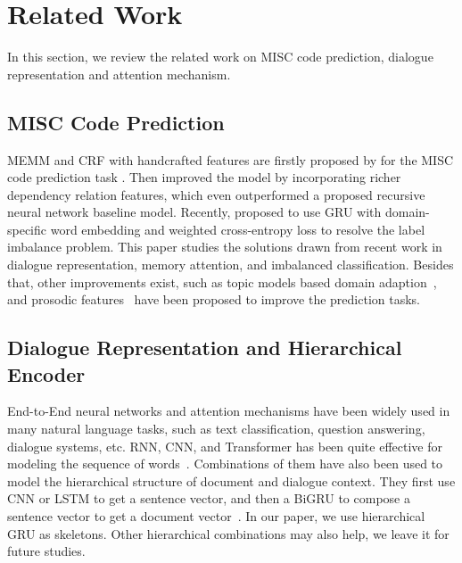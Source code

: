 \section{Related Work}
\label{sec:sentential:related}
In this section, we review the related work on MISC code prediction,
dialogue representation and attention mechanism.

\subsection{MISC Code Prediction}
\label{ssec:sentential:misc-related}

MEMM and CRF with handcrafted features are firstly proposed by
\citet{can2012case, can2015dialog} for the MISC code prediction task
. Then \citet{tanana2015recursive} improved the model by incorporating
richer dependency relation features, which even outperformed a
proposed recursive neural network baseline model. Recently,
\citet{xiao2016behavioral} proposed to use GRU with domain-specific word
embedding and weighted cross-entropy loss to resolve the label
imbalance problem. This paper studies the solutions drawn from
recent work in dialogue representation, memory attention, and
imbalanced classification. Besides that, other improvements exist,
such as topic models based domain adaption~\citep{atkins2014scaling,
  huang2018modeling}, and prosodic features~\citep{weber2002using} have
been proposed to improve the prediction tasks.

\subsection{Dialogue Representation and Hierarchical Encoder }
\label{ssec:sentential:dialogue-encoder}

End-to-End neural networks and attention mechanisms have been widely
used in many natural language tasks, such as text classification,
question answering, dialogue systems, etc.  RNN, CNN, and
Transformer has been quite effective for modeling the sequence of
words~\citep{ kim14cnn,zhang2015character}. Combinations of them have
also been used to model the hierarchical structure of document and
dialogue context. They first use CNN or LSTM to get a sentence vector,
and then a BiGRU to compose a sentence vector to get a document
vector~\citep{tang2015document, li2015hierarchical,
  yang2016hierarchical,sordoni2015hierarchical, serban2016building,
  serban2017multiresolution}. In our paper, we use hierarchical GRU as
skeletons. Other hierarchical combinations may also help, we leave it
for future studies.

